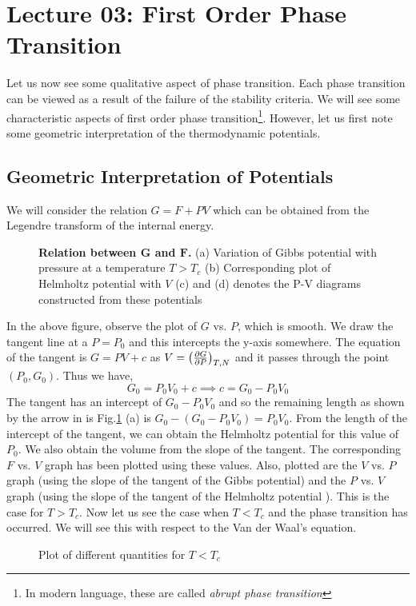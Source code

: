 \section*{Lecture 03: First Order Phase Transition}
Let us now see some qualitative aspect of phase transition. Each phase transition can be viewed as a result of the failure of the stability criteria. We will see some characteristic aspects of first order phase transition\footnote{In modern language, these are called \textit{abrupt phase transition}}. However, let us first note some geometric interpretation of the thermodynamic potentials.
\subsection{Geometric Interpretation of Potentials}
We will consider the relation $G=F+PV$ which can be obtained from the Legendre transform of the internal energy. 
\begin{figure}[H]
    \centering 
    
    \caption{\textbf{Relation between $\mathbf{G}$ and $\mathbf{F}$.} (a) Variation of Gibbs potential with pressure at a temperature $T>T_c$ (b) Corresponding plot of Helmholtz potential with $V$ (c) and (d) denotes the P-V diagrams constructed from these potentials}
    \label{fig:lec31}
\end{figure}
\noindent
In the above figure, observe the plot of $G$ vs. $P$, which is smooth. We draw the tangent line at a $P=P_0$ and this intercepts the y-axis somewhere. The equation of the tangent is $G= PV+c$ as $V = \qty(\pdv{G}{P})_{T,N}$ and it passes through the point $(P_0, G_0)$. Thus we have,
$$G_0 = P_0 V_0 + c \implies c = G_0-P_0V_0$$
The tangent has an intercept of $G_0-P_0V_0$ and so the remaining length as shown by the arrow in is Fig.\ref{fig:lec31} (a) is $G_0-(G_0-P_0V_0) = P_0V_0$. From the length of the intercept of the tangent, we can obtain the Helmholtz potential for this value of $P_0$. We also obtain the volume from the slope of the tangent. The corresponding $F$ vs. $V$ graph has been plotted using these values. Also, plotted are the $V$ vs. $P$ graph (using the slope of the tangent of the Gibbs potential) and the $P$ vs. $V$ graph (using the slope of the tangent of the Helmholtz potential ). This is the case for $T>T_c$. Now let us see the case when $T<T_c$ and the phase transition has occurred. We will see this with respect to the Van der Waal's equation.
\begin{figure}[H]
    \centering
    
    \caption{Plot of different quantities for $T<T_c$}
    \label{fig:lec32}
\end{figure}
